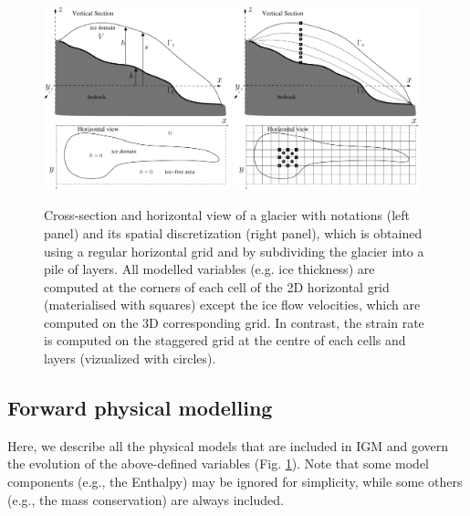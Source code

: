 \documentclass[gmd]{copernicus}
\begin{document}
\begin{figure}[!h]
\begin{center} 
\includegraphics[width=0.48\textwidth]{fig/scheme.pdf}   
\includegraphics[width=0.48\textwidth]{fig/scheme_dis.pdf} 
\end{center}
\caption{Cross-section and horizontal view of a glacier with notations (left panel) and its spatial discretization (right panel), which is obtained using a regular horizontal grid and by subdividing the glacier into a pile of layers. All modelled variables (e.g. ice thickness) are computed at the corners of each cell of the 2D horizontal grid (materialised with squares) except the ice flow velocities, which are computed on the 3D corresponding grid. In contrast, the strain rate is computed on the staggered grid at the centre of each cells and layers (vizualized with circles). \label{notations}}
\end{figure}

\subsection{Forward physical modelling}

Here, we describe all the physical models that are included in IGM and govern the evolution of the above-defined variables (Fig. \ref{notations}). Note that some model components (e.g., the Enthalpy) may be ignored for simplicity, while some others (e.g., the mass conservation) are always included.
\end{document}
